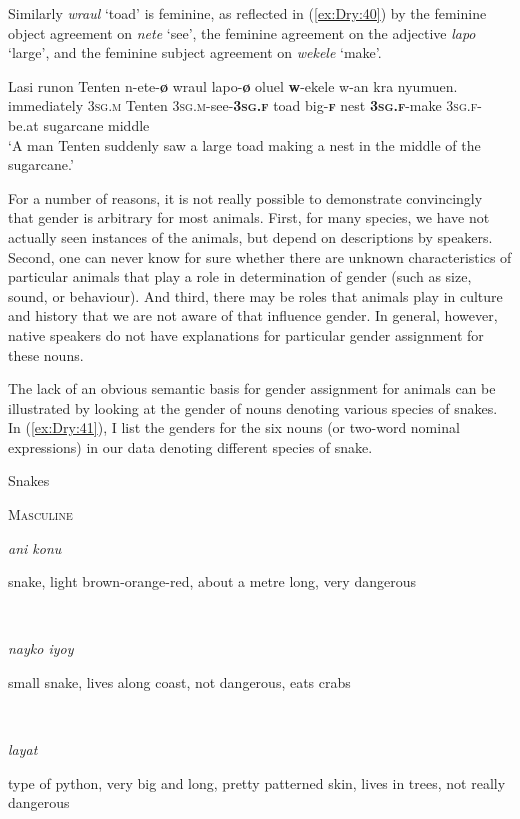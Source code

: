 \documentclass[output=collectionpaper]{langsci/langscibook}
\begin{document}
Similarly \textit{wraul} `toad' is feminine, as reflected in (\ref{ex:Dry:40}) by the feminine object agreement on \textit{nete} `see', the feminine agreement on the adjective \textit{lapo} `large', and the feminine subject agreement on \textit{wekele} `make'.

\ea \label{ex:Dry:40}
\gll Lasi	runon	Tenten	n-ete-\textbf{ø}	wraul lapo-\textbf{ø}	oluel	\textbf{w}-ekele	w-an kra	nyumuen.\\
immediately \textsc{3sg.m} Tenten \textsc{3sg.m}-see-\textbf{\textsc{3sg.f}} toad big-\textbf{\textsc{f}} nest \textbf{\textsc{3sg.f}}-make \textsc{3sg.f}-be.at sugarcane middle\\
\glt  `A man Tenten suddenly saw a large toad making a nest in the middle of the sugarcane.'
\z

For a number of reasons, it is not really possible to demonstrate convincingly that gender is arbitrary for most animals. First, for many species, we have not actually seen instances of the animals, but depend on descriptions by speakers. Second, one can never know for sure whether there are unknown characteristics of particular animals that play a role in determination of gender (such as size, sound, or behaviour). And third, there may be roles that animals play in  culture and history that we are not aware of that influence gender. In general, however, native speakers do not have explanations for particular gender assignment for these nouns.

The lack of an obvious semantic basis for gender assignment for animals can be illustrated by looking at the gender of nouns denoting various species of snakes. In (\ref{ex:Dry:41}), I list the genders for the six nouns (or two-word nominal expressions) in our data denoting different species of snake.

\ea   \label{ex:Dry:41}
Snakes

\textsc{Masculine}\\
\smallskip\parbox[t]{20mm}{\textit{ani konu}}\parbox[t]{90mm}{snake, light brown-orange-red, about a metre long, very dangerous}\\
\smallskip\parbox[t]{20mm}{\textit{nayko iyoy}}\parbox[t]{90mm}{small snake, lives along coast, not dangerous, eats crabs}\\
\smallskip\parbox[t]{20mm}{\textit{layat}}\parbox[t]{90mm}{type of python, very big and long, pretty patterned skin, lives in trees, not really dangerous}\\\bigskip
\end{document}
